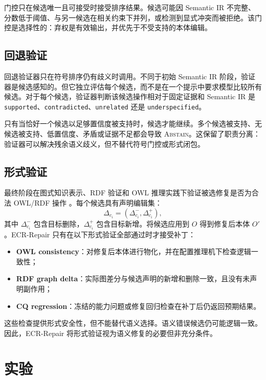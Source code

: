 \documentclass[conference]{IEEEtran}
\begin{document}
门控只在候选唯一且可接受时接受排序结果。候选可能因 Semantic IR 不完整、分数低于阈值、与另一候选在相关约束下并列，或检测到显式冲突而被拒绝。该门控是选择性的：弃权是有效输出，并优先于不受支持的本体编辑。

\subsection{回退验证}

回退验证器只在符号排序仍有歧义时调用。不同于初始 Semantic IR 阶段，验证器是候选感知的。但它独立评估每个候选，而不是在一个提示中要求模型比较所有候选。对于每个候选，验证器判断该候选操作相对于固定证据和 Semantic IR 是 \texttt{supported}、\texttt{contradicted}、\texttt{unrelated} 还是 \texttt{underspecified}。

只有当恰好一个候选以足够置信度被支持时，候选才能继续。多个候选被支持、无候选被支持、低置信度、矛盾或证据不足都会导致 \textsc{Abstain}。这保留了职责分离：验证器可以解决残余语义歧义，但不替代符号门控或形式闭包。

\subsection{形式验证}

最终阶段在图式知识表示、RDF 验证和 OWL 推理实践下验证被选修复是否为合法 OWL/RDF 操作 \cite{hogan2021knowledgegraphs,pareti2021shaclreview,heist2021caligraph}。每个候选具有声明编辑集：
\[
\Delta_{c_i}=(\Delta^-_{c_i},\Delta^+_{c_i}),
\]
其中 $\Delta^-_{c_i}$ 包含目标删除，$\Delta^+_{c_i}$ 包含目标新增。将候选应用到 $O$ 得到修复后本体 $O'$。ECR-Repair 只有在以下形式验证全部通过时才接受补丁：
\begin{itemize}
    \item \textbf{OWL consistency}：对修复后本体进行物化，并在配置推理机下检查逻辑一致性；
    \item \textbf{RDF graph delta}：实际图差分与候选声明的新增和删除一致，且没有未声明副作用；
    \item \textbf{CQ regression}：冻结的能力问题或修复回归检查在补丁后仍返回预期结果。
\end{itemize}

这些检查提供形式安全性，但不能替代语义选择。语义错误候选仍可能逻辑一致。因此，ECR-Repair 将形式验证视为语义修复的必要但非充分条件。

\section{实验}
\end{document}
